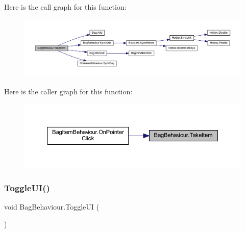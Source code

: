 Here is the call graph for this function\+:
\nopagebreak
\begin{figure}[H]
\begin{center}
\leavevmode
\includegraphics[width=350pt]{class_bag_behaviour_a0cde4989737c537ca94730cc690d6780_cgraph}
\end{center}
\end{figure}
Here is the caller graph for this function\+:
\nopagebreak
\begin{figure}[H]
\begin{center}
\leavevmode
\includegraphics[width=350pt]{class_bag_behaviour_a0cde4989737c537ca94730cc690d6780_icgraph}
\end{center}
\end{figure}
\mbox{\label{class_bag_behaviour_a830725c05ecdc1a1a637d26cf5cff0dc}} 
\subsubsection{\texorpdfstring{ToggleUI()}{ToggleUI()}}
{\footnotesize\ttfamily void Bag\+Behaviour.\+Toggle\+UI (\begin{DoxyParamCaption}{ }\end{DoxyParamCaption})}

